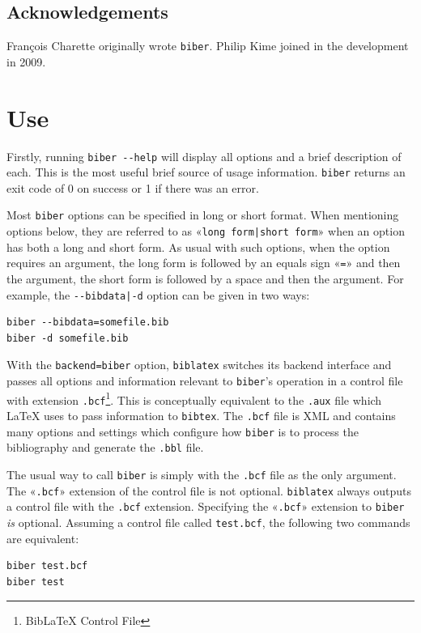 \documentclass{ltxdockit}
\begin{document}
\subsection{Acknowledgements}

François Charette originally wrote \verb+biber+. Philip Kime joined in
the development in 2009.

\section{Use}

Firstly, running \verb+biber --help+ will display all options and a brief
description of each. This is the most useful brief source of usage
information. \verb+biber+ returns an exit code of 0 on success or 1 if
there was an error.

Most \verb+biber+ options can be specified in long or short format. When
mentioning options below, they are referred to as
«\verb+long form|short form+» when an option has both a long and short
form. As usual with such options, when the option requires an argument, the
long form is followed by an equals sign «\verb+=+» and then the argument,
the short form is followed by a space and then the argument. For example,
the \verb+--bibdata|-d+ option can be given in two ways:

\begin{verbatim}
biber --bibdata=somefile.bib
biber -d somefile.bib
\end{verbatim}

With the \verb+backend=biber+ option, \verb+biblatex+ switches its backend
interface and passes all options and information relevant to \verb+biber+'s
operation in a control file with extension \verb+.bcf+\footnote{BibLaTeX Control
  File}. This is conceptually equivalent to the \verb+.aux+ file which
LaTeX uses to pass information to \verb+bibtex+. The \verb+.bcf+ file is
XML and contains many options and settings which configure how \verb+biber+
is to process the bibliography and generate the \verb+.bbl+ file.

The usual way to call \verb+biber+ is simply with the \verb+.bcf+ file
as the only argument. The «\verb+.bcf+» extension of the control file
is not optional. \verb+biblatex+ always outputs a control file with
the \verb+.bcf+ extension. Specifying the «\verb+.bcf+» extension to
\verb+biber+ \emph{is} optional. Assuming a control file called
\verb+test.bcf+, the following two commands are equivalent:

\begin{verbatim}
biber test.bcf
biber test
\end{verbatim}
\end{document}
